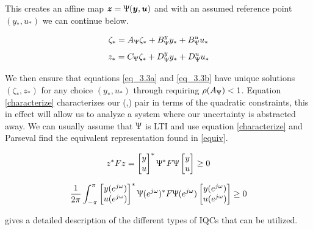 \documentclass{article}[12pt]
\begin{document}
\noindent This creates an affine map $\boldsymbol{z} = \Uppsi (\boldsymbol{y},\boldsymbol{u})$ and with an assumed reference point $(y_*,u_*)$ we can continue below. 

\begin{equation}
\label{eq_3.3a}
    \zeta_* = A_\Uppsi \zeta_* + B^y_\Uppsi y_* + B^u_\Uppsi u_*
\end{equation}
\begin{equation}
\label{eq_3.3b}
    z_* = C_\Uppsi \zeta_*+ D^y_\Uppsi y_*+ D^u_\Uppsi u_*
\end{equation}

We then ensure that equations \ref{eq_3.3a} and \ref{eq_3.3b} have unique solutions $(\zeta_*,z_*)$ for any choice $(y_*,u_*)$ through requiring $\rho(A_\Uppsi) < 1 $. Equation \ref{characterize} characterizes our (,) pair in terms of the quadratic constraints, this in effect will allow us to analyze a system where our uncertainty is abstracted away. We can usually assume that $\Uppsi$ is LTI and use equation \ref{characterize} and Parseval find the equivalent representation found in \ref{equiv}.

\begin{equation}
\label{characterize}
    z^* F z = 
    \begin{bmatrix}
        y \\
         u
    \end{bmatrix}^*
    \Uppsi^* F \Uppsi 
    \begin{bmatrix}
        y \\
         u
    \end{bmatrix} \geq 0
\end{equation}

\begin{equation}
    \label{equiv}
    \frac{1}{2 \pi} \int_{-\pi}^{\pi} 
    \begin{bmatrix}
        y(e^{j\omega}) \\
         u(e^{j\omega})
    \end{bmatrix}^*
    \Uppsi (e^{j\omega})^* F \Uppsi (e^{j\omega})
    \begin{bmatrix}
        y(e^{j\omega}) \\
         u(e^{j\omega})
    \end{bmatrix} \geq 0
\end{equation}


\noindent \cite{lessard2014analysis} gives a detailed description of the different types of IQCs that can be utilized. 
\end{document}
